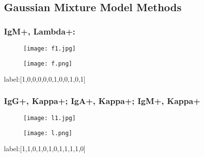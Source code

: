 \documentclass[12pt]{ctexart}
\begin{document}
\subsection{Gaussian Mixture Model Methods}
\subsubsection{IgM+, Lambda+:}
\begin{figure}[H]
    \centering
    \texttt{[image: f1.jpg]}
\end{figure}
\begin{figure}[H]
    \centering
    \texttt{[image: f.png]}
\end{figure}
label:[1,0,0,0,0,0,1,0,0,1,0,1]
\subsubsection{IgG+, Kappa+; IgA+, Kappa+; IgM+, Kappa+}
\begin{figure}[H]
    \centering
    \texttt{[image: l1.jpg]}
\end{figure}
\begin{figure}[H]
    \centering
    \texttt{[image: l.png]}
\end{figure}
label:[1,1,0,1,0,1,0,1,1,1,1,0]
\end{document}
